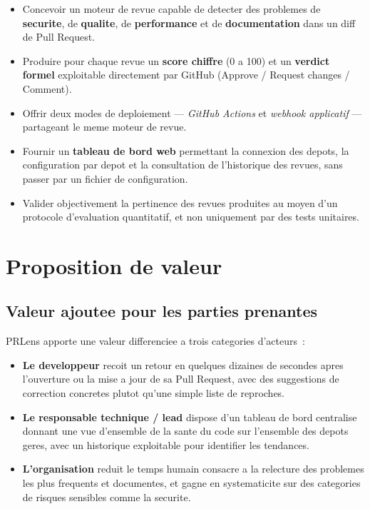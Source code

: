 \documentclass[a4paper,12pt,oneside]{report}
\begin{document}
\begin{itemize}
  \item Concevoir un moteur de revue capable de detecter des problemes de \textbf{securite}, de \textbf{qualite}, de \textbf{performance} et de \textbf{documentation} dans un diff de Pull Request.
  \item Produire pour chaque revue un \textbf{score chiffre} (0 a 100) et un \textbf{verdict formel} exploitable directement par GitHub (Approve / Request changes / Comment).
  \item Offrir deux modes de deploiement --- \emph{GitHub Actions} et \emph{webhook applicatif} --- partageant le meme moteur de revue.
  \item Fournir un \textbf{tableau de bord web} permettant la connexion des depots, la configuration par depot et la consultation de l'historique des revues, sans passer par un fichier de configuration.
  \item Valider objectivement la pertinence des revues produites au moyen d'un protocole d'evaluation quantitatif, et non uniquement par des tests unitaires.
\end{itemize}

\section{Proposition de valeur}

\subsection{Valeur ajoutee pour les parties prenantes}

PRLens apporte une valeur differenciee a trois categories d'acteurs~:

\begin{itemize}
  \item \textbf{Le developpeur} recoit un retour en quelques dizaines de secondes apres l'ouverture ou la mise a jour de sa Pull Request, avec des suggestions de correction concretes plutot qu'une simple liste de reproches.
  \item \textbf{Le responsable technique / lead} dispose d'un tableau de bord centralise donnant une vue d'ensemble de la sante du code sur l'ensemble des depots geres, avec un historique exploitable pour identifier les tendances.
  \item \textbf{L'organisation} reduit le temps humain consacre a la relecture des problemes les plus frequents et documentes, et gagne en systematicite sur des categories de risques sensibles comme la securite.
\end{itemize}
\end{document}
